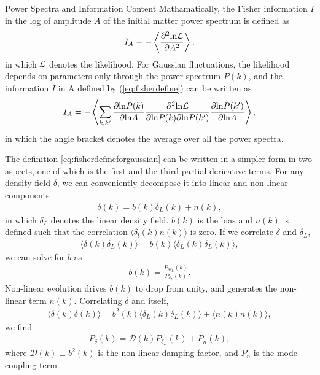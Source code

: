 \begin{section}{Power Spectra and Information Content}
   Mathamatically, the Fisher information \cite{bib:Tegmark1997} $I$ in the log of amplitude $A$ of the initial 
matter power spectrum is defined as 
\begin{align}
   I_A \equiv -\left\langle \frac{\partial ^2 \mathrm{ln \mathcal{L}}}{\partial A ^2}\right\rangle,
\label{eq:fisherdefine}
\end{align}
   in which $\mathcal{L}$ denotes the likelihood. For Gaussian fluctuations, the likelihood depends on
parameters only through the power spectrum $P(k)$, and the information $I$ in A defined by (\ref{eq:fisherdefine})
can be written as \cite{bib:Rimes2006}
\begin{align}
    I_A = - \left\langle \sum_{k,k'} \frac{\partial \mathrm{ln} P(k)}{\partial \mathrm{ln} A} 
\frac{\partial ^2 \mathrm{ln \mathcal{L}}}{\partial \mathrm{ln} P(k) \partial \mathrm{ln} P(k')}
\frac{\partial \mathrm{ln} P(k')}{\partial \mathrm{ln} A}\right\rangle,
\label{eq:fisherdefineforgaussian}
\end{align}
in which the angle bracket denotes the average over all the power spectra.

  The definition \ref{eq:fisherdefineforgaussian} can be written in a simpler form in two aspects, one 
of which is the first and the third partial dericative terms. 
For any density field $\delta$, we can conveniently decompose it into linear and non-linear components
\begin{align}
    \delta (k) = b (k) \delta _L (k) + n (k),
\label{eq:decompose}
\end{align}
in which $\delta_L$ denotes the linear density field. $b (k)$ is the bias and $n (k)$ is defined  
such that the correlation $\langle \delta_l (k) n (k) \rangle$ is zero. If we correlate  
$\delta$ and $\delta_L$,
\begin{align}
   \langle \delta (k) \delta_L (k) \rangle = b (k) \langle \delta_L (k) \delta_L (k) \rangle,
\label{eq:correlating}
\end{align} 
    we can solve for $b$ as 
\begin{align}
    b (k) = \frac{P _{\delta \delta_L}(k)}{P_{\delta_L}(k)}.
\label{eq:bofk}
\end{align}
Non-linear evolution drives $b (k)$ to drop from unity, and generates the non-linear term $n (k)$. 
Correlating $\delta$ and itself, 
\begin{align}
  \langle \delta (k) \delta (k) \rangle = b^2 (k) \langle \delta_L (k) \delta_L (k) \rangle + \langle n(k)n(k) \rangle,
\end{align}
we find 
\begin{align}
   P_\delta (k) = \mathcal{D} (k) P_{\delta_L} (k) + P_n (k),
\label{eq:powerdecompose}
\end{align}
where $\mathcal{D}(k) \equiv b^2 (k)$ is the non-linear damping factor, and $P_n$ is the mode-coupling term.


\end{section}
